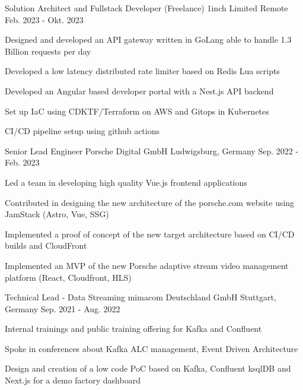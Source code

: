 \begin{cventries}
  \cventry
    {Solution Architect and Fullstack Developer (Freelance)} %
    {1inch Limited} %
    {Remote} %
    {Feb. 2023 - Okt. 2023} %
    {
      \begin{cvitems} %
        \item {Designed and developed an API gateway written in GoLang able to handle 1.3 Billion requests per day}
        \item {Developed a low latency distributed rate limiter based on Redis Lua scripts}
        \item {Developed an Angular based developer portal with a Nest.js API backend}
        \item {Set up IaC using CDKTF/Terraform on AWS and Gitops in Kubernetes}
        \item {CI/CD pipeline setup using github actions}
      \end{cvitems}
    }

  \cventry
    {Senior Lead Engineer} %
    {Porsche Digital GmbH} %
    {Ludwigsburg, Germany} %
    {Sep. 2022 - Feb. 2023} %
    {
      \begin{cvitems} %
        \item {Led a team in developing high quality Vue.js frontend applications}
        \item {Contributed in designing the new architecture of the porsche.com website using JamStack (Astro, Vue, SSG)}
        \item {Implemented a proof of concept of the new target architecture based on CI/CD builds and CloudFront}
        \item {Implemented an MVP of the new Porsche adaptive stream video management platform (React, Cloudfront, HLS)}
      \end{cvitems}
    }

  \cventry
    {Technical Lead - Data Streaming} %
    {mimacom Deutschland GmbH} %
    {Stuttgart, Germany} %
    {Sep. 2021 - Aug. 2022} %
    {
      \begin{cvitems} %
        \item {Internal trainings and public training offering for Kafka and Confluent}
        \item {Spoke in conferences about Kafka ALC management, Event Driven Architecture}
        \item {Design and creation of a low code PoC based on Kafka, Confluent ksqlDB and Next.js for a demo factory dashboard}
      \end{cvitems}
    }


\end{cventries}
